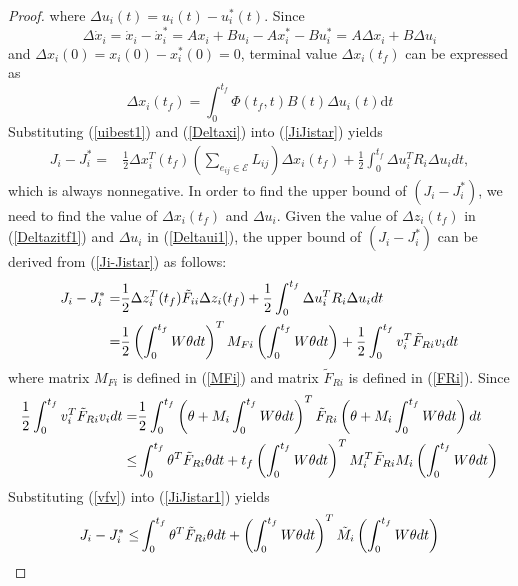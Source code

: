 \documentclass[12pt,draftcls,onecolumn]{IEEEtran}  %
\begin{document}
\begin{proof}
where $\Delta u_i(t)=u_i(t)-u_i^*(t)$. Since
\begin{equation}
\Delta\dot{x}_i=\dot{x}_i-\dot{x}_i^*=Ax_i+Bu_i-Ax_i^*-Bu^*_i=A\Delta x_i+ B\Delta u_i
\end{equation}
and $\Delta x_i(0)=x_i(0)-x^*_i(0)=0$, terminal value $\Delta x_i(t_f)$ can be expressed as
\begin{equation}
\Delta x_i(t_f)=\int^{t_f}_0\Phi(t_f,t)B(t)\Delta u_i(t)\mbox{d}t\label{Deltaxi}
\end{equation}
Substituting (\ref{uibest1}) and (\ref{Deltaxi}) into (\ref{JiJistar}) yields
\begin{align}
J_i-J_i^*=&\frac{1}{2}\Delta x^T_i(t_f)\left(\sum_{e_{ij}\in\mathcal{E}}L_{ij}\right)\Delta x_i(t_f)+\frac{1}{2}\int^{t_f}_0\Delta u_i^TR_i\Delta u_idt\label{Ji-Jistar},
\end{align}
which is always nonnegative. In order to find the upper bound of $(J_i-J_i^*)$, we need to find the value of $\Delta x_i(t_f)$ and $\Delta u_i$. Given the value of $\Delta z_i(t_f)$ in
(\ref{Deltazitf1}) and $\Delta u_i$ in (\ref{Deltaui1}), the upper bound of
$(J_i-J_i^*)$ can be derived from (\ref{Ji-Jistar}) as follows:
\begin{align}
J_i-J_i^*=&\frac{1}{2} \Delta z_i^T(t_f)\tilde{F}_{ii}\Delta
z_i(t_f)+\frac{1}{2}\int^{t_f}_0\Delta u^T_iR_i\Delta u_i\mbox{d}t\notag\\
=&\frac{1}{2} \left(\int^{t_f}_0W\theta\mbox{d}t\right)^T M_{Fi}\left(\int^{t_f}_0W\theta\mbox{d}t\right) +\frac{1}{2}\int^{t_f}_0
v_i^T \tilde{F}_{Ri}v_i\mbox{d}t\label{JiJistar1}
\end{align}
where matrix $M_{Fi}$ is defined in (\ref{MFi}) and matrix $\tilde{F}_{Ri}$ is
defined in (\ref{FRi}). Since
\begin{align}
\frac{1}{2}\int^{t_f}_0
v_i^T \tilde{F}_{Ri}v_i\mbox{d}t=&\frac{1}{2}
\int^{t_f}_0\left( \theta+M_i\int^{t_f}_0W\theta\mbox{d}t\right)^T \tilde{F}_{Ri}\left( \theta+M_i\int^{t_f}_0W\theta\mbox{d}t\right)\mbox{d}t
\notag\\
\leq&
\int^{t_f}_0\theta^T\tilde{F}_{Ri}\theta\mbox{d}t+ t_f\left(\int^{t_f}_0W\theta\mbox{d}t\right)^T M_i^T\tilde{F}_{Ri}M_i \left(\int^{t_f}_0W\theta\mbox{d}t\right)\label{vfv}
\end{align}
Substituting (\ref{vfv}) into (\ref{JiJistar1}) yields
\begin{align*}
J_i-J_i^*\leq&\int^{t_f}_0
\theta^T \tilde{F}_{Ri}\theta\mbox{d}t +\left(\int^{t_f}_0W\theta\mbox{d}t\right)^T \tilde{M}_i
\left(\int^{t_f}_0W\theta\mbox{d}t\right)\notag\\

\end{align*}
\end{proof}
\end{document}
